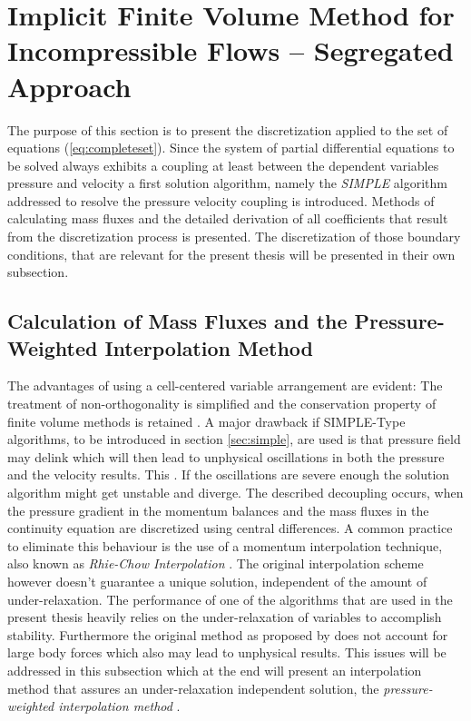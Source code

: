 \section{Implicit Finite Volume Method for Incompressible Flows -- Segregated Approach}

  The purpose of this section is to present the discretization applied to the set of equations (\ref{eq:completeset}). Since the system of partial differential equations to be solved always exhibits a coupling at least between the dependent variables pressure and velocity a first solution algorithm, namely the \emph{SIMPLE} algorithm addressed to resolve the pressure velocity coupling is introduced. Methods of calculating mass fluxes and the detailed derivation of all coefficients that result from the discretization process is presented. The discretization of those boundary conditions, that are relevant for the present thesis will be presented in their own subsection.

  \subsection{Calculation of Mass Fluxes and the Pressure-Weighted Interpolation Method}

  The advantages of using a cell-centered variable arrangement are evident: The treatment of non-orthogonality is simplified and the conservation property of finite volume methods is retained \cite{choi99,majumdar88,miller88,zhang14}. A major drawback if SIMPLE-Type algorithms, to be introduced in section \ref{sec:simple}, are used is that pressure field may delink which will then lead to unphysical oscillations in both the pressure and the velocity results. This . If the oscillations are severe enough the solution algorithm might get unstable and diverge. The described decoupling occurs, when the pressure gradient in the momentum balances and the mass fluxes in the continuity equation are discretized using central differences. A common practice to eliminate this behaviour is the use of a momentum interpolation technique, also known as \emph{Rhie-Chow Interpolation} \cite{rhie82}. The original interpolation scheme however doesn't guarantee a unique solution, independent of the amount of under-relaxation. The performance of one of the algorithms that are used in the present thesis heavily relies on the under-relaxation of variables to accomplish stability. Furthermore the original method as proposed by \cite{rhie82} does not account for large body forces which also may lead to unphysical results. This issues will be addressed in this subsection which at the end will present an interpolation method that assures an under-relaxation independent solution, the \emph{pressure-weighted interpolation method} \cite{miller88}.

